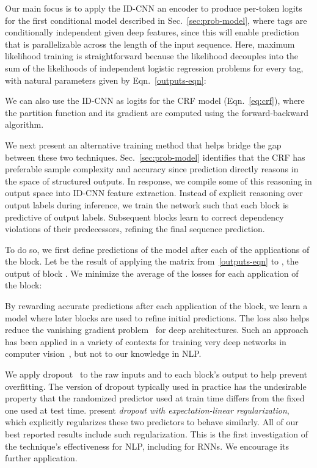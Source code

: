 \documentclass[11pt,letterpaper]{article}
\begin{document}
Our main focus is to apply the ID-CNN an encoder to produce per-token logits for the first conditional model described in Sec.~\ref{sec:prob-model}, where tags are conditionally independent given deep features, since this will enable prediction that is parallelizable across the length of the input sequence. Here, maximum likelihood training is straightforward because the likelihood decouples into the sum of the likelihoods of independent logistic regression problems for every tag, with natural parameters given by Eqn.~\eqref{outputs-eqn}:


We can also use the ID-CNN as logits for the CRF model (Eqn.~\eqref{eq:crf}), where the partition function and its gradient are computed using the forward-backward algorithm. 

We next present an alternative training method that helps bridge the gap between these two techniques. Sec.~\ref{sec:prob-model} identifies that the CRF has preferable sample complexity and accuracy since prediction directly reasons in the space of structured outputs. In response, we compile some of this reasoning in output space into ID-CNN feature extraction. Instead of explicit reasoning over output labels during inference, we train the network such that each block is predictive of output labels. Subsequent blocks learn to correct dependency violations of their predecessors, refining the final sequence prediction.

To do so, we first define predictions of the model after each of the  applications of the block. Let  be the result of applying the matrix  from~\eqref{outputs-eqn} to , the output of block . We minimize the average of the losses for each application of the block: 


By rewarding accurate predictions after each application of the block, we learn a model where later blocks are used to refine initial predictions. The loss also helps reduce the vanishing gradient problem~\citep{hochreiter1998vanishing} for deep architectures. Such an approach has been applied in a variety of contexts for training very deep networks in computer vision~\citep{romero2014fitnets,szegedy2015going,lee2015deeply,gulccehre2016knowledge}, but not to our knowledge in NLP.

We apply dropout~\citep{srivastava2014dropout} to the raw inputs  and to each block's output  to help prevent overfitting. The version of dropout typically used in practice has the undesirable property that the randomized predictor used at train time differs from the fixed one used at test time. \citet{ma2017dropout} present \textit{dropout with expectation-linear regularization}, which explicitly regularizes these two predictors to behave similarly. All of our best reported results include such regularization. This is the first investigation of the technique's effectiveness for NLP, including for RNNs. We encourage its further application.
\end{document}
